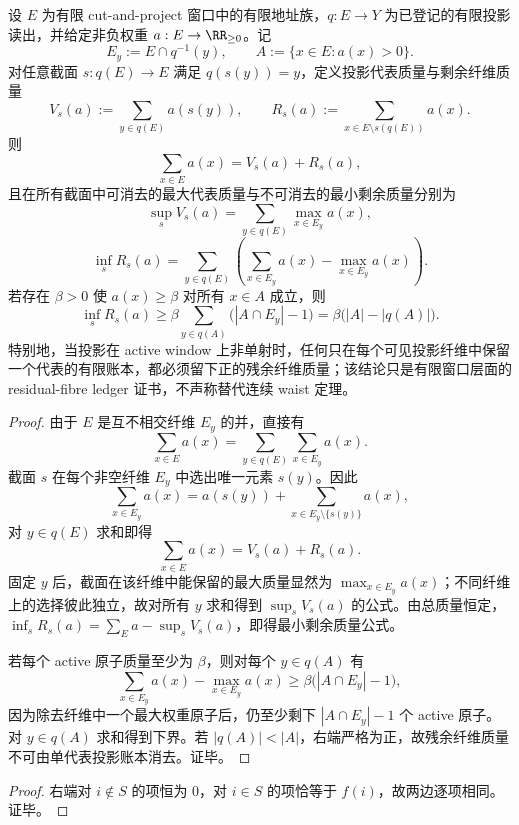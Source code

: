 \begin{proposition}[有限窗口投影的剩余纤维质量账本]\label{distill:gromov-dimension_waist_projection_families-highdim-finite-window-residual-fibre-ledger}
设 \(E\) 为有限 cut-and-project 窗口中的有限地址族，\(q:E\to Y\) 为已登记的有限投影读出，并给定非负权重 \(a:E\to\RR_{\ge0}\)。记
\[
E_y:=E\cap q^{-1}(y),\qquad A:=\{x\in E:a(x)>0\}.
\]
对任意截面 \(s:q(E)\to E\) 满足 \(q(s(y))=y\)，定义投影代表质量与剩余纤维质量
\[
V_s(a):=\sum_{y\in q(E)}a(s(y)),\qquad
R_s(a):=\sum_{x\in E\setminus s(q(E))}a(x).
\]
则
\[
\sum_{x\in E}a(x)=V_s(a)+R_s(a),
\]
且在所有截面中可消去的最大代表质量与不可消去的最小剩余质量分别为
\[
\sup_s V_s(a)=\sum_{y\in q(E)}\max_{x\in E_y}a(x),
\]
\[
\inf_s R_s(a)=\sum_{y\in q(E)}\left(\sum_{x\in E_y}a(x)-\max_{x\in E_y}a(x)\right).
\]
若存在 \(\beta>0\) 使 \(a(x)\ge\beta\) 对所有 \(x\in A\) 成立，则
\[
\inf_s R_s(a)\ge
\beta\sum_{y\in q(A)}\bigl(|A\cap E_y|-1\bigr)
=\beta\bigl(|A|-|q(A)|\bigr).
\]
特别地，当投影在 active window 上非单射时，任何只在每个可见投影纤维中保留一个代表的有限账本，都必须留下正的残余纤维质量；该结论只是有限窗口层面的 residual-fibre ledger 证书，不声称替代连续 waist 定理。
\end{proposition}
\begin{proof}
由于 \(E\) 是互不相交纤维 \(E_y\) 的并，直接有
\[
\sum_{x\in E}a(x)=\sum_{y\in q(E)}\sum_{x\in E_y}a(x).
\]
截面 \(s\) 在每个非空纤维 \(E_y\) 中选出唯一元素 \(s(y)\)。因此
\[
\sum_{x\in E_y}a(x)=a(s(y))+\sum_{x\in E_y\setminus\{s(y)\}}a(x),
\]
对 \(y\in q(E)\) 求和即得
\[
\sum_{x\in E}a(x)=V_s(a)+R_s(a).
\]
固定 \(y\) 后，截面在该纤维中能保留的最大质量显然为 \(\max_{x\in E_y}a(x)\)；不同纤维上的选择彼此独立，故对所有 \(y\) 求和得到 \(\sup_sV_s(a)\) 的公式。由总质量恒定，\(\inf_sR_s(a)=\sum_Ea-\sup_sV_s(a)\)，即得最小剩余质量公式。

若每个 active 原子质量至少为 \(\beta\)，则对每个 \(y\in q(A)\) 有
\[
\sum_{x\in E_y}a(x)-\max_{x\in E_y}a(x)
\ge \beta\bigl(|A\cap E_y|-1\bigr),
\]
因为除去纤维中一个最大权重原子后，仍至少剩下 \(|A\cap E_y|-1\) 个 active 原子。对 \(y\in q(A)\) 求和得到下界。若 \(|q(A)|<|A|\)，右端严格为正，故残余纤维质量不可由单代表投影账本消去。证毕。
\end{proof}

\begin{proof}
右端对 \(i\notin S\) 的项恒为 \(0\)，对 \(i\in S\) 的项恰等于 \(f(i)\)，故两边逐项相同。证毕。
\end{proof}
